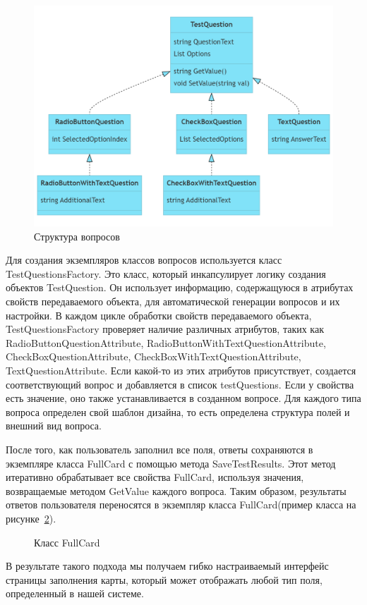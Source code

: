 \begin{figure}
  \includegraphics[scale=0.4]{inc/questions.png}
  \caption{Структура вопросов}
  \label{fig:questions}
\end{figure}


Для создания экземпляров классов вопросов используется класс TestQuestionsFactory. Это класс, который инкапсулирует логику создания объектов TestQuestion. Он использует информацию, содержащуюся в атрибутах свойств передаваемого объекта, для автоматической генерации вопросов и их настройки. В каждом цикле обработки свойств передаваемого объекта, TestQuestionsFactory проверяет наличие различных атрибутов, таких как RadioButtonQuestionAttribute, RadioButtonWithTextQuestionAttribute, CheckBoxQuestionAttribute, CheckBoxWithTextQuestionAttribute, TextQuestionAttribute. Если какой-то из этих атрибутов присутствует, создается соответствующий вопрос и добавляется в список testQuestions. Если у свойства есть значение, оно также устанавливается в созданном вопросе. Для каждого типа вопроса определен свой шаблон дизайна, то есть определена структура полей и внешний вид вопроса.

После того, как пользователь заполнил все поля, ответы сохраняются в экземпляре класса FullCard с помощью метода SaveTestResults. Этот метод итеративно обрабатывает все свойства FullCard, используя значения, возвращаемые методом GetValue каждого вопроса. Таким образом, результаты ответов пользователя переносятся в экземпляр класса FullCard(пример класса на рисунке~\ref{src:question}).

\begin{figure}

\caption{Класс FullCard}
\label{src:question}
\end{figure}

В результате такого подхода мы получаем гибко настраиваемый интерфейс страницы заполнения карты, который может отображать любой тип поля, определенный в нашей системе.